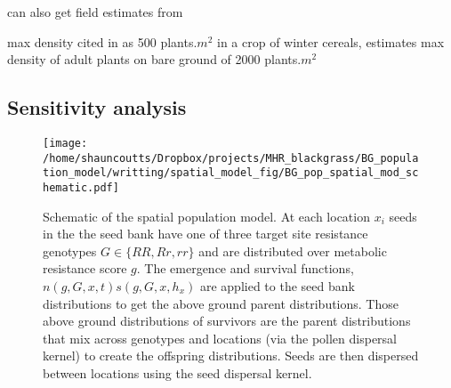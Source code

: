 \documentclass[12pt, a4paper]{article}
\begin{document}
can also get field estimates from \cite{Cava1999}

max density cited in \cite{Doyl1986} as 500 plants$.m^2$ in a crop of winter cereals, \cite{Colb2007} estimates max density of adult plants on bare ground of 2000 plants$.m^2$  

\subsection{Sensitivity analysis}



 


\begin{figure}[htbp] \label{fig:schematic}
	\texttt{[image: /home/shauncoutts/Dropbox/projects/MHR\_blackgrass/BG\_population\_model/writting/spatial\_model\_fig/BG\_pop\_spatial\_mod\_schematic.pdf]}
\caption{Schematic of the spatial population model. At each location $x_i$ seeds in the the seed bank have one of three target site resistance genotypes $G \in \{RR, Rr, rr\}$ and are distributed over metabolic resistance score $g$. The emergence and survival functions, $n(g, G, x, t)s(g, G, x, h_x)$ are applied to the seed bank distributions to get the above ground parent distributions. Those above ground distributions of survivors are the parent distributions that mix across genotypes and locations (via the pollen dispersal kernel) to create the offspring distributions. Seeds are then dispersed between locations using the seed dispersal kernel.}
\end{figure}
\end{document}
